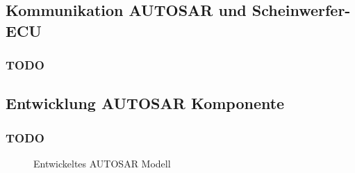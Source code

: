 \documentclass[]{beamer}
\newcommand{\inputImage}[1]{}
\begin{document}
\subsection{Kommunikation AUTOSAR und Scheinwerfer-ECU}
\begin{frame}
\frametitle{TODO}

\end{frame}




\subsection{Entwicklung AUTOSAR Komponente}
\begin{frame}
\frametitle{TODO}
    \begin{figure}[ht]
        \centering
        \resizebox{\linewidth}{!}{\inputImage{SMLS_Modell.dia}}
        \caption{Entwickeltes AUTOSAR Modell}
        \label{fig:smls_modell}
    \end{figure}
\end{frame}




\end{document}
